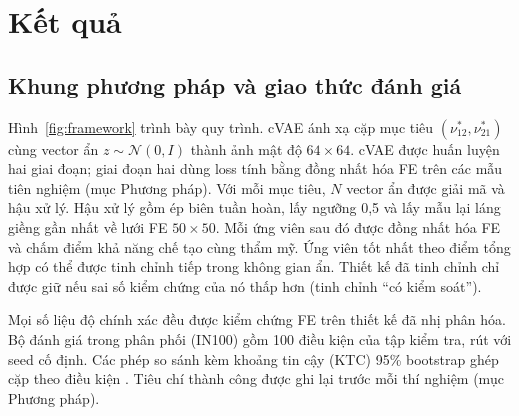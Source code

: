 \documentclass[a4paper,11pt]{article}
\newcommand{\nuot}{\nu_{12}}
\newcommand{\nuto}{\nu_{21}}
\begin{document}
\section{Kết quả}

\subsection{Khung phương pháp và giao thức đánh giá}

Hình~\ref{fig:framework} trình bày quy trình. cVAE ánh xạ cặp mục tiêu
$(\nuot^{*},\nuto^{*})$ cùng vector ẩn $z\sim\mathcal N(0,I)$ thành ảnh mật
độ $64\times64$. cVAE được huấn luyện hai giai đoạn; giai đoạn hai dùng loss
tính bằng đồng nhất hóa FE trên các mẫu tiên nghiệm (mục Phương pháp). Với
mỗi mục tiêu, $N$ vector ẩn được giải mã và hậu xử lý. Hậu xử lý gồm ép biên
tuần hoàn, lấy ngưỡng 0,5 và lấy mẫu lại láng giềng gần nhất về lưới FE
$50\times50$. Mỗi ứng viên sau đó được đồng nhất hóa FE và chấm điểm khả
năng chế tạo cùng thẩm mỹ. Ứng viên tốt nhất theo điểm tổng hợp có thể được
tinh chỉnh tiếp trong không gian ẩn. Thiết kế đã tinh chỉnh chỉ được giữ nếu
sai số kiểm chứng của nó thấp hơn (tinh chỉnh ``có kiểm soát'').

Mọi số liệu độ chính xác đều được kiểm chứng FE trên thiết kế đã nhị phân
hóa. Bộ đánh giá trong phân phối (IN100) gồm 100 điều kiện của tập kiểm tra,
rút với seed cố định. Các phép so sánh kèm khoảng tin cậy (KTC) 95\%
bootstrap ghép cặp theo điều kiện \citep{efron1993bootstrap}. Tiêu chí thành
công được ghi lại trước mỗi thí nghiệm (mục Phương pháp).
\end{document}
